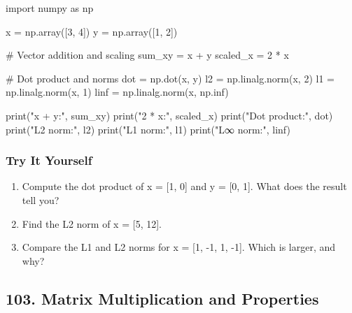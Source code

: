 \documentclass[
  letterpaper,
  DIV=11,
  numbers=noendperiod]{scrreprt}
\newenvironment{Shaded}{\begin{snugshade}}{\end{snugshade}}
\newcommand{\BuiltInTok}[1]{\textcolor[rgb]{0.00,0.23,0.31}{#1}}
\newcommand{\CommentTok}[1]{\textcolor[rgb]{0.37,0.37,0.37}{#1}}
\newcommand{\DecValTok}[1]{\textcolor[rgb]{0.68,0.00,0.00}{#1}}
\newcommand{\ImportTok}[1]{\textcolor[rgb]{0.00,0.46,0.62}{#1}}
\newcommand{\NormalTok}[1]{\textcolor[rgb]{0.00,0.23,0.31}{#1}}
\newcommand{\OperatorTok}[1]{\textcolor[rgb]{0.37,0.37,0.37}{#1}}
\newcommand{\StringTok}[1]{\textcolor[rgb]{0.13,0.47,0.30}{#1}}
\providecommand{\tightlist}{%
  \setlength{\itemsep}{0pt}\setlength{\parskip}{0pt}}
\begin{document}
\begin{Shaded}
\begin{Highlighting}[]
\ImportTok{import}\NormalTok{ numpy }\ImportTok{as}\NormalTok{ np}

\NormalTok{x }\OperatorTok{=}\NormalTok{ np.array([}\DecValTok{3}\NormalTok{, }\DecValTok{4}\NormalTok{])}
\NormalTok{y }\OperatorTok{=}\NormalTok{ np.array([}\DecValTok{1}\NormalTok{, }\DecValTok{2}\NormalTok{])}

\CommentTok{\# Vector addition and scaling}
\NormalTok{sum\_xy }\OperatorTok{=}\NormalTok{ x }\OperatorTok{+}\NormalTok{ y}
\NormalTok{scaled\_x }\OperatorTok{=} \DecValTok{2} \OperatorTok{*}\NormalTok{ x}

\CommentTok{\# Dot product and norms}
\NormalTok{dot }\OperatorTok{=}\NormalTok{ np.dot(x, y)}
\NormalTok{l2 }\OperatorTok{=}\NormalTok{ np.linalg.norm(x, }\DecValTok{2}\NormalTok{)}
\NormalTok{l1 }\OperatorTok{=}\NormalTok{ np.linalg.norm(x, }\DecValTok{1}\NormalTok{)}
\NormalTok{linf }\OperatorTok{=}\NormalTok{ np.linalg.norm(x, np.inf)}

\BuiltInTok{print}\NormalTok{(}\StringTok{"x + y:"}\NormalTok{, sum\_xy)}
\BuiltInTok{print}\NormalTok{(}\StringTok{"2 * x:"}\NormalTok{, scaled\_x)}
\BuiltInTok{print}\NormalTok{(}\StringTok{"Dot product:"}\NormalTok{, dot)}
\BuiltInTok{print}\NormalTok{(}\StringTok{"L2 norm:"}\NormalTok{, l2)}
\BuiltInTok{print}\NormalTok{(}\StringTok{"L1 norm:"}\NormalTok{, l1)}
\BuiltInTok{print}\NormalTok{(}\StringTok{"L∞ norm:"}\NormalTok{, linf)}
\end{Highlighting}
\end{Shaded}

\subsubsection{Try It Yourself}\label{try-it-yourself-101}

\begin{enumerate}
\def\labelenumi{\arabic{enumi}.}
\tightlist
\item
  Compute the dot product of x = {[}1, 0{]} and y = {[}0, 1{]}. What
  does the result tell you?
\item
  Find the L2 norm of x = {[}5, 12{]}.
\item
  Compare the L1 and L2 norms for x = {[}1, -1, 1, -1{]}. Which is
  larger, and why?
\end{enumerate}

\subsection{103. Matrix Multiplication and
Properties}\label{matrix-multiplication-and-properties}
\end{document}
